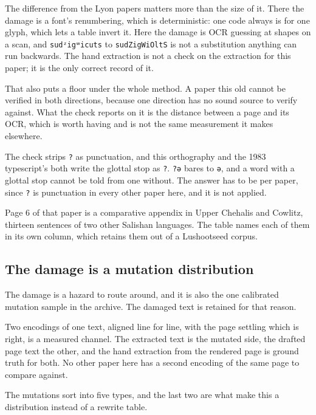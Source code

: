 The difference from the Lyon papers matters more than the size of it. There the damage is a font's renumbering, which is deterministic: one code always is for one glyph, which lets a table invert it. Here the damage is OCR guessing at shapes on a scan, and \texttt{sudᶻigʷicuts} to \texttt{sudZigWiOltS} is not a substitution anything can run backwards. The hand extraction is not a check on the extraction for this paper; it is the only correct record of it.

That also puts a floor under the whole method. A paper this old cannot be verified in both directions, because one direction has no sound source to verify against. What the check reports on it is the distance between a page and its OCR, which is worth having and is not the same measurement it makes elsewhere.

The check strips \texttt{?} as punctuation, and this orthography and the 1983 typescript's both write the glottal stop as \texttt{?}. \texttt{?ə} bares to \texttt{ə}, and a word with a glottal stop cannot be told from one without. The answer has to be per paper, since \texttt{?} is punctuation in every other paper here, and it is not applied.

Page 6 of that paper is a comparative appendix in Upper Chehalis and Cowlitz, thirteen sentences of two other Salishan languages. The table names each of them in its own column, which retains them out of a Lushootseed corpus.

\subsection{The damage is a mutation distribution}

The damage is a hazard to route around, and it is also the one calibrated mutation sample in the archive. The damaged text is retained for that reason.

Two encodings of one text, aligned line for line, with the page settling which is right, is a measured channel. The extracted text is the mutated side, the drafted page text the other, and the hand extraction from the rendered page is ground truth for both. No other paper here has a second encoding of the same page to compare against.

The mutations sort into five types, and the last two are what make this a distribution instead of a rewrite table.

